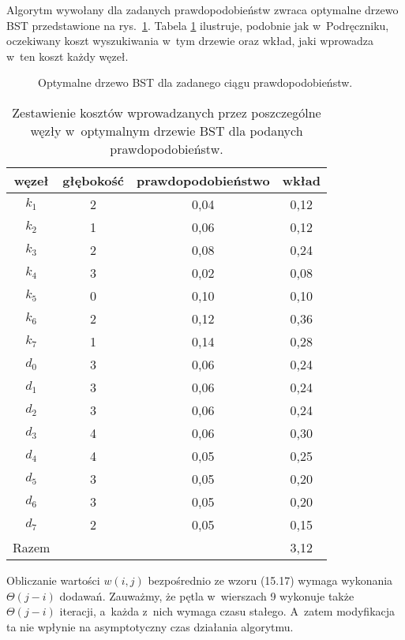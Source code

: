 \exercise %
Algorytm  wywołany dla zadanych prawdopodobieństw zwraca optymalne drzewo BST przedstawione na rys.\ \ref{fig:15.5-2}.
Tabela \ref{tab:15.5-2} ilustruje, podobnie jak w~Podręczniku, oczekiwany koszt wyszukiwania w~tym drzewie oraz wkład, jaki wprowadza w~ten koszt każdy węzeł.
\begin{figure}[!ht]
	\centering 
	\caption{Optymalne drzewo BST dla zadanego ciągu prawdopodobieństw.} \label{fig:15.5-2}
\end{figure}
\begin{table}[!ht]
	\centering
		\begin{tabular}{cccc}
			węzeł & głębokość & prawdopodobieństwo & wkład \\ \hline
			$k_1$ & 2 & 0{,}04 & 0{,}12 \\
			$k_2$ & 1 & 0{,}06 & 0{,}12 \\
			$k_3$ & 2 & 0{,}08 & 0{,}24 \\
			$k_4$ & 3 & 0{,}02 & 0{,}08 \\
			$k_5$ & 0 & 0{,}10 & 0{,}10 \\
			$k_6$ & 2 & 0{,}12 & 0{,}36 \\
			$k_7$ & 1 & 0{,}14 & 0{,}28 \\
			$d_0$ & 3 & 0{,}06 & 0{,}24 \\
			$d_1$ & 3 & 0{,}06 & 0{,}24 \\
			$d_2$ & 3 & 0{,}06 & 0{,}24 \\
			$d_3$ & 4 & 0{,}06 & 0{,}30 \\
			$d_4$ & 4 & 0{,}05 & 0{,}25 \\
			$d_5$ & 3 & 0{,}05 & 0{,}20 \\
			$d_6$ & 3 & 0{,}05 & 0{,}20 \\
			$d_7$ & 2 & 0{,}05 & 0{,}15 \\ \hline
			Razem & & & 3{,}12
		\end{tabular} \caption{Zestawienie kosztów wprowadzanych przez poszczególne węzły w~optymalnym drzewie BST dla podanych prawdopodobieństw.} \label{tab:15.5-2}
\end{table}

\exercise %
Obliczanie wartości $w(i,j)$ bezpośrednio ze wzoru (15.17) wymaga wykonania $\Theta(j-i)$ dodawań.
Zauważmy, że pętla  w~wierszach 9 wykonuje także $\Theta(j-i)$ iteracji, a~każda z~nich wymaga czasu stałego.
A~zatem modyfikacja ta nie wpłynie na asymptotyczny czas działania algorytmu.

